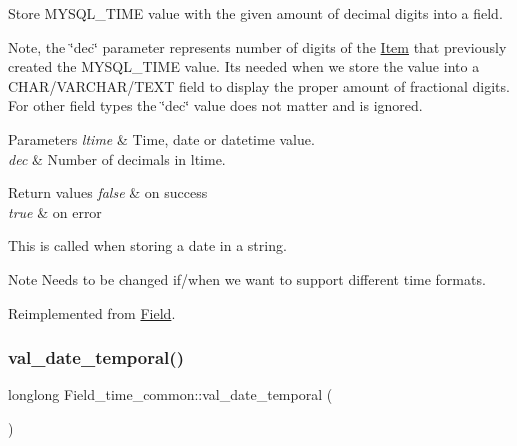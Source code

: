 Store M\+Y\+S\+Q\+L\+\_\+\+T\+I\+ME value with the given amount of decimal digits into a field.

Note, the \char`\"{}dec\char`\"{} parameter represents number of digits of the \mbox{\hyperlink{classItem}{Item}} that previously created the M\+Y\+S\+Q\+L\+\_\+\+T\+I\+ME value. It\textquotesingle{}s needed when we store the value into a C\+H\+A\+R/\+V\+A\+R\+C\+H\+A\+R/\+T\+E\+XT field to display the proper amount of fractional digits. For other field types the \char`\"{}dec\char`\"{} value does not matter and is ignored.


\begin{DoxyParams}{Parameters}
{\em ltime} & Time, date or datetime value. \\
\hline
{\em dec} & Number of decimals in ltime. \\
\hline
\end{DoxyParams}

\begin{DoxyRetVals}{Return values}
{\em false} & on success \\
\hline
{\em true} & on error\\
\hline
\end{DoxyRetVals}
This is called when storing a date in a string.

\begin{DoxyNote}{Note}
Needs to be changed if/when we want to support different time formats. 
\end{DoxyNote}


Reimplemented from \mbox{\hyperlink{classField_a7433aa07355def6c394687567256e6cf}{Field}}.

\mbox{\label{classField__time__common_a78d985bb5c8a86a8860bff1315839c10}} 
\subsubsection{\texorpdfstring{val\+\_\+date\+\_\+temporal()}{val\_date\_temporal()}}
{\footnotesize\ttfamily longlong Field\+\_\+time\+\_\+common\+::val\+\_\+date\+\_\+temporal (\begin{DoxyParamCaption}{ }\end{DoxyParamCaption})\hspace{0.3cm}{\ttfamily [virtual]}}

